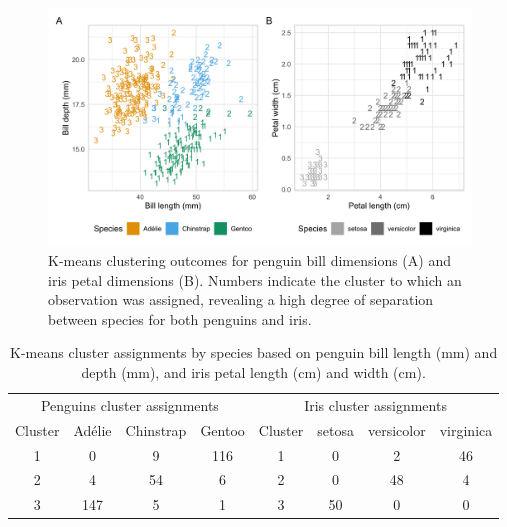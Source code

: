 \begin{Schunk}
\begin{figure}[htbp]

{\centering \includegraphics[width=\textwidth]{figs/kmeans-1} 

}

\caption[K-means clustering outcomes for penguin bill dimensions (A) and iris petal dimensions (B)]{K-means clustering outcomes for penguin bill dimensions (A) and iris petal dimensions (B). Numbers indicate the cluster to which an observation was assigned, revealing a high degree of separation between species for both penguins and iris.}\label{fig:kmeans}
\end{figure}
\end{Schunk}

\begin{Schunk}
\begin{table}

\caption{\label{tab:unnamed-chunk-1}K-means cluster assignments by species based on penguin bill length (mm) and depth (mm), and iris petal length (cm) and width (cm).}
\centering
\begin{tabular}[t]{cccccccc}
\toprule
\multicolumn{4}{c}{Penguins cluster assignments} & \multicolumn{4}{c}{Iris cluster assignments} \\
\cmidrule(l{3pt}r{3pt}){1-4} \cmidrule(l{3pt}r{3pt}){5-8}
Cluster & Adélie & Chinstrap & Gentoo & Cluster & setosa & versicolor & virginica\\
\midrule
1 & 0 & 9 & 116 & 1 & 0 & 2 & 46\\
2 & 4 & 54 & 6 & 2 & 0 & 48 & 4\\
3 & 147 & 5 & 1 & 3 & 50 & 0 & 0\\
\bottomrule
\end{tabular}
\end{table}

\end{Schunk}

